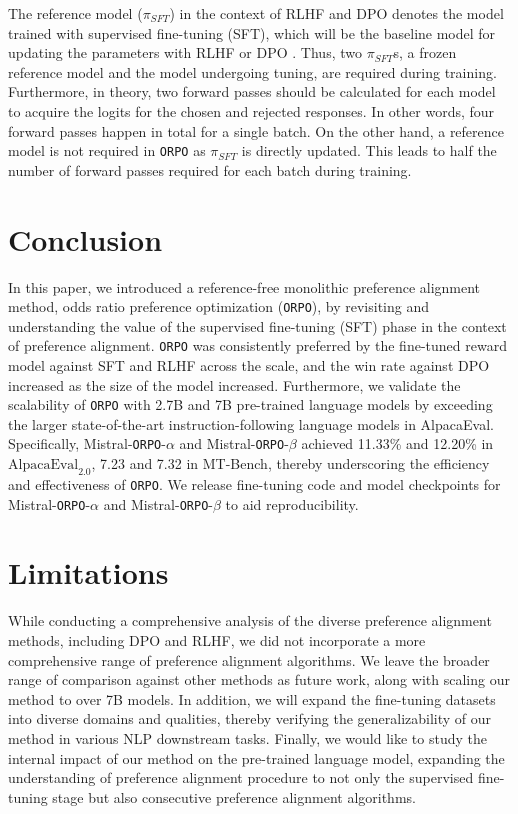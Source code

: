 The reference model ($\pi_{SFT}$) in the context of RLHF and DPO denotes the model trained with supervised fine-tuning (SFT), which will be the baseline model for updating the parameters with RLHF or DPO \citep{ziegler2020finetuning,rafailov2023direct}. Thus, two $\pi_{SFT}$s, a frozen reference model and the model undergoing tuning, are required during training. Furthermore, in theory, two forward passes should be calculated for each model to acquire the logits for the chosen and rejected responses. In other words, four forward passes happen in total for a single batch. 
On the other hand, a reference model is not required in \texttt{ORPO} as $\pi_{SFT}$ is directly updated. This leads to half the number of forward passes required for each batch during training.

\section{Conclusion}

In this paper, we introduced a reference-free monolithic preference alignment method, odds ratio preference optimization (\texttt{ORPO}), by revisiting and understanding the value of the supervised fine-tuning (SFT) phase in the context of preference alignment. \texttt{ORPO} was consistently preferred by the fine-tuned reward model against SFT and RLHF across the scale, and the win rate against DPO increased as the size of the model increased. Furthermore, we validate the scalability of \texttt{ORPO} with 2.7B and 7B pre-trained language models by exceeding the larger state-of-the-art instruction-following language models in AlpacaEval. Specifically, Mistral-\texttt{ORPO}-$\alpha$ and Mistral-\texttt{ORPO}-$\beta$ achieved 11.33\% and 12.20\% in $\text{AlpacaEval}_{2.0}$, 7.23 and 7.32 in MT-Bench, thereby underscoring the efficiency and effectiveness of \texttt{ORPO}. We release fine-tuning code and model checkpoints for Mistral-\texttt{ORPO}-$\alpha$ and Mistral-\texttt{ORPO}-$\beta$ to aid reproducibility.

\section*{Limitations}

While conducting a comprehensive analysis of the diverse preference alignment methods, including DPO and RLHF, we did not incorporate a more comprehensive range of preference alignment algorithms. We leave the broader range of comparison against other methods as future work, along with scaling our method to over 7B models. In addition, we will expand the fine-tuning datasets into diverse domains and qualities, thereby verifying the generalizability of our method in various NLP downstream tasks. Finally, we would like to study the internal impact of our method on the pre-trained language model, expanding the understanding of preference alignment procedure to not only the supervised fine-tuning stage but also consecutive preference alignment algorithms.

\setlength{\jot}{10pt}

\onecolumn

